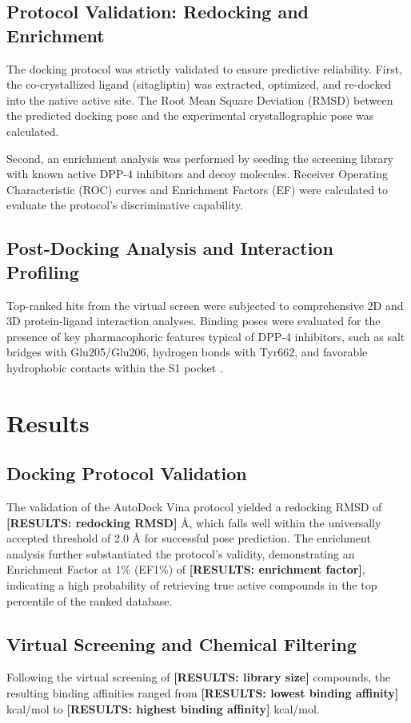 \documentclass[12pt]{article}
\begin{document}
\subsection{Protocol Validation: Redocking and Enrichment}
The docking protocol was strictly validated to ensure predictive reliability. 
First, the co-crystallized ligand (sitagliptin) was extracted, optimized, and re-docked into the native active site. The Root Mean Square Deviation (RMSD) between the predicted docking pose and the experimental crystallographic pose was calculated.

Second, an enrichment analysis was performed by seeding the screening library with known active DPP-4 inhibitors \citep{Zhang2020} and decoy molecules. Receiver Operating Characteristic (ROC) curves and Enrichment Factors (EF) were calculated to evaluate the protocol's discriminative capability.

\subsection{Post-Docking Analysis and Interaction Profiling}
Top-ranked hits from the virtual screen were subjected to comprehensive 2D and 3D protein-ligand interaction analyses. Binding poses were evaluated for the presence of key pharmacophoric features typical of DPP-4 inhibitors, such as salt bridges with Glu205/Glu206, hydrogen bonds with Tyr662, and favorable hydrophobic contacts within the S1 pocket \citep{Gonzatti2023, Kim2018}.

\section{Results}

\subsection{Docking Protocol Validation}
The validation of the AutoDock Vina protocol yielded a redocking RMSD of \textbf{[RESULTS: redocking RMSD]} \AA{}, which falls well within the universally accepted threshold of 2.0 \AA{} for successful pose prediction. 
The enrichment analysis further substantiated the protocol's validity, demonstrating an Enrichment Factor at 1\% (EF1\%) of \textbf{[RESULTS: enrichment factor]}, indicating a high probability of retrieving true active compounds in the top percentile of the ranked database.

\subsection{Virtual Screening and Chemical Filtering}
Following the virtual screening of \textbf{[RESULTS: library size]} compounds, the resulting binding affinities ranged from \textbf{[RESULTS: lowest binding affinity]} kcal/mol to \textbf{[RESULTS: highest binding affinity]} kcal/mol. 
\end{document}
